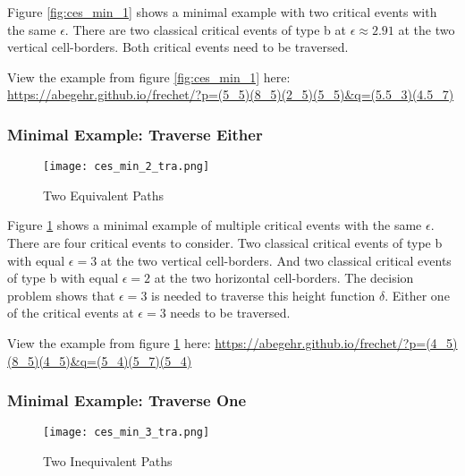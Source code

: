 Figure \ref{fig:ces_min_1} shows a minimal example with two critical events with the same $\epsilon$. There are two classical critical events of type b at $\epsilon \approx 2.91$ at the two vertical cell-borders. Both critical events need to be traversed.

View the example from figure \ref{fig:ces_min_1} here: \url{https://abegehr.github.io/frechet/?p=(5_5)(8_5)(2_5)(5_5)&q=(5.5_3)(4.5_7)}


\subsubsection{Minimal Example: Traverse Either}

\begin{figure}[H]
    \centering
    
    \texttt{[image: ces\_min\_2\_tra.png]}
		
	\caption{Two Equivalent Paths}
    \label{fig:ces_min_2}
\end{figure}

Figure \ref{fig:ces_min_2} shows a minimal example of multiple critical events with the same $\epsilon$. There are four critical events to consider. Two classical critical events of type b with equal $\epsilon = 3$ at the two vertical cell-borders. And two classical critical events of type b with equal $\epsilon = 2$ at the two horizontal cell-borders. The decision problem shows that $\epsilon = 3$ is needed to traverse this height function $\delta$. Either one of the critical events at $\epsilon = 3$ needs to be traversed.

View the example from figure \ref{fig:ces_min_2} here: \url{https://abegehr.github.io/frechet/?p=(4_5)(8_5)(4_5)&q=(5_4)(5_7)(5_4)}



\subsubsection{Minimal Example: Traverse One}

\begin{figure}[H]
    \centering
    
    \texttt{[image: ces\_min\_3\_tra.png]}
		
	\caption{Two Inequivalent Paths}
    \label{fig:ces_min_3}
\end{figure}

